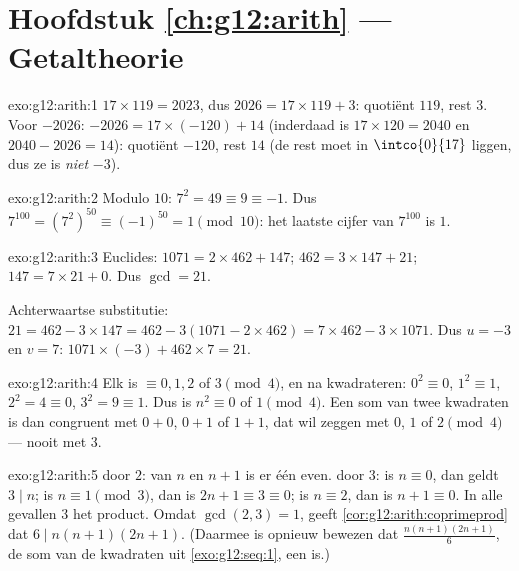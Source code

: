 \section*{Hoofdstuk \ref{ch:g12:arith} --- Getaltheorie}

\begin{solution}{exo:g12:arith:1}
$17 \times 119 = 2023$, dus $2026 = 17 \times 119 + 3$: quotiënt $119$, rest
$3$. Voor $-2026$: $-2026 = 17\times(-120) + 14$ (inderdaad is
$17 \times 120 = 2040$ en $2040 - 2026 = 14$): quotiënt $-120$, rest $14$ (de
rest moet in $\intco{0}{17}$ liggen, dus ze is \emph{niet} $-3$).
\end{solution}

\begin{solution}{exo:g12:arith:2}
Modulo $10$: $7^2 = 49 \equiv 9 \equiv -1$. Dus
$7^{100} = \left(7^2\right)^{50} \equiv (-1)^{50} = 1 \pmod{10}$: het laatste
cijfer van $7^{100}$ is $1$.
\end{solution}

\begin{solution}{exo:g12:arith:3}
Euclides: $1071 = 2\times462 + 147$; $462 = 3\times147 + 21$;
$147 = 7\times21 + 0$. Dus $\gcd = 21$.

Achterwaartse substitutie: $21 = 462 - 3\times147 = 462 - 3(1071 - 2\times462)
= 7\times462 - 3\times1071$. Dus $u = -3$ en $v = 7$:
$1071\times(-3) + 462\times7 = 21$.
\end{solution}

\begin{solution}{exo:g12:arith:4}
Elk  is $\equiv 0, 1, 2$ of $3 \pmod 4$, en na kwadrateren:
$0^2 \equiv 0$, $1^2 \equiv 1$, $2^2 = 4 \equiv 0$, $3^2 = 9 \equiv 1$. Dus is
$n^2 \equiv 0$ of $1 \pmod 4$. Een som van twee kwadraten is dan congruent met
$0 + 0$, $0 + 1$ of $1 + 1$, dat wil zeggen met $0$, $1$ of $2 \pmod 4$ ---
nooit met $3$.
\end{solution}

\begin{solution}{exo:g12:arith:5}
 door $2$: van $n$ en $n + 1$ is er één even.  door
$3$: is $n \equiv 0$, dan geldt $3 \mid n$; is $n \equiv 1 \pmod 3$, dan is
$2n + 1 \equiv 3 \equiv 0$; is $n \equiv 2$, dan is $n + 1 \equiv 0$. In alle
gevallen  $3$ het product. Omdat $\gcd(2,3) = 1$, geeft
\cref{cor:g12:arith:coprimeprod} dat $6 \mid n(n+1)(2n+1)$.
(Daarmee is opnieuw bewezen dat $\frac{n(n+1)(2n+1)}{6}$, de som van de
kwadraten uit \cref{exo:g12:seq:1}, een  is.)
\end{solution}

